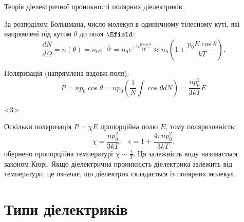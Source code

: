 \documentclass[onlytextwidth]{beamer}
\begin{document}
\begin{frame}{Теорія діелектричної проникності полярних діелектриків}{}
\begin{onlyenv}
\begin{center}
\begin{tikzpicture}[>=latex, scale=0.7, transform shape]
			\end{tikzpicture}
		\end{center}
	\end{onlyenv}
	\vspace*{-2em}
	\begin{overprint}
		\begin{block}{}\justifying
			За розподілом Больцмана, число молекул в одиничному тілесному куті, які напрямлені під кутом
			$\theta$ до поля $\Efield$:
			\begin{equation*}
				\frac{dN}{d\Omega} = n(\theta) = n_0e^{-\frac{U}{kT}} =
				n_0e^{+\frac{p_0E\cos\theta}{kT}}
				\approx  n_0\left(1 + \frac{p_0E\cos\theta}{kT}\right).
			\end{equation*}
		\end{block}
		\begin{block}{}
			Поляризація (напрямлена вздовж поля):
			\begin{equation*}
				P =  n p_0 \overline{\cos\theta} = n p_0 \left( \frac 1N \int \cos\theta d N\right)  =
				\frac{n
					p_0^2}{3kT}E
			\end{equation*}
		\end{block}
	\end{overprint}
	\begin{onlyenv}
		\begin{block}{}\justifying
			Оскільки поляризація $P = \chi E$ пропорційна полю $E$, тому  поляризовність:
			\begin{equation*}
				\chi = \frac{n p_0^2}{3kT}. \quad \epsilon = 1 + \frac{4\pi np_0^2}{3kT}.
			\end{equation*}
			обернено пропорційна температурі $\chi \sim \frac1T$. Ця залежність виду називається \alert{законом
				Кюрі}. Якщо діелектрична проникність діелектрика залежить від температури, це означає, що
			діелектрик складається із полярних молекул.
		\end{block}
	\end{onlyenv}
\end{frame}



\section{Типи діелектриків}
\end{document}
